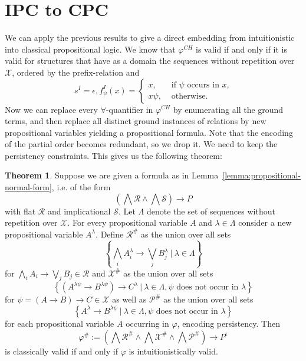 \documentclass{easychair}
\theoremstyle{definition}
\newtheorem{theorem}{Theorem}[section]
\theoremstyle{definition}
\theoremstyle{definition}
\theoremstyle{definition}
\theoremstyle{definition}
\theoremstyle{definition}
\theoremstyle{definition}
\begin{document}
\section{IPC to CPC}
\label{sec:ipc-to-cpc}

We can apply the previous results to give a direct embedding from intuitionistic into classical propositional logic. We know that $\varphi^{CH}$ is valid if and only if it is valid for structures that have as a domain the sequences without repetition over $\mathcal X$, ordered by the prefix-relation and $$s^I = \epsilon, f_\psi^I(x) = \begin{cases}
	x, &\text{ if $\psi$ occurs in $x$,}\\
	x\psi, &\text{ otherwise.}
\end{cases}$$
Now we can replace every $\forall$-quantifier in $\varphi^{CH}$ by enumerating all the ground terms, and then replace all distinct ground instances of relations by new propositional variables yielding a propositional formula. Note that the encoding of the partial order becomes redundant, so we drop it. We need to keep the persistency constraints. This gives us the following theorem:

\begin{theorem}\label{thm:prop-translation}
	Suppose we are given a formula as in Lemma~\ref{lemma:propositional-normal-form}, i.e. of the form
	$$\left(\bigwedge\mathcal R\wedge\bigwedge\mathcal S\right)\to P$$
	with flat $\mathcal R$ and implicational $\mathcal S$. Let $\Lambda$ denote the set of sequences without repetition over $\mathcal X$. For every propositional variable $A$ and $\lambda\in\Lambda$ consider a new propositional variable $A^\lambda$. Define $\mathcal R^\#$ as the union over all sets
	$$
		\left\{\bigwedge_iA_i^\lambda\to\bigvee_jB_j^\lambda\:|\:\lambda\in\Lambda\right\}
	$$
	for $\bigwedge_iA_i\to\bigvee_jB_j\in\mathcal R$ and $\mathcal X^\#$ as the union over all sets
	$$
		\left\{\left(A^{\lambda\psi} \to B^{\lambda\psi}\right)\to C^\lambda\:|\:\lambda\in\Lambda, \psi\text{ does not occur in }\lambda\right\}
	$$
	for $\psi = (A\to B)\to C\in\mathcal X$ as well as $\mathcal P^\#$ as the union over all sets
	$$
		\left\{A^\lambda\to B^{\lambda\psi}\:|\:\lambda\in\Lambda, \psi\text{ does not occur in }\lambda\right\}
	$$
	 for each propositional variable $A$ occurring in $\varphi$, encoding persistency. Then
	$$
		\varphi^\# := \left(\bigwedge \mathcal R^\#\wedge\bigwedge\mathcal X^\#\wedge\bigwedge \mathcal P^\#\right)\to P^\epsilon
	$$
	is classically valid if and only if $\varphi$ is intuitionistically valid.
\end{theorem}
\end{document}
